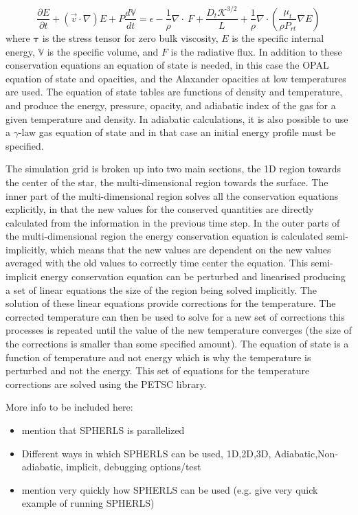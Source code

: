 \documentclass[12pt,a4paper]{book}
\begin{document}
\begin{equation}
\frac{\partial E}{\partial t}+(\vec{v}\cdot\nabla)E+P\frac{d\mathbb{V}}{dt}=\epsilon-\frac{1}{\rho}\nabla\cdot\ F+\frac{D_t\mathcal{K}^{3/2}}{L}+\frac{1}{\rho}\nabla\cdot\left(\frac{\mu_t}{\rho P_{rt}}\nabla E\right)
\end{equation}
where $\mathbf{\tau}$ is the stress tensor for zero bulk viscosity, $E$ is the specific internal energy, $\mathbb{V}$ is the specific volume, and $F$ is the radiative flux. In addition to these conservation equations an equation of state is needed, in this case the OPAL equation of state and opacities, and the Alaxander opacities at low temperatures are used. The equation of state tables are functions of density and temperature, and produce the energy, pressure, opacity, and adiabatic index of the gas for a given temperature and density. In adiabatic calculations, it is also possible to use a $\gamma$-law gas equation of state and in that case an initial energy profile must be specified.

The simulation grid is broken up into two main sections, the 1D region towards the center of the star, the multi-dimensional region towards the surface. The inner part of the multi-dimensional region solves all the conservation equations explicitly, in that the new values for the conserved quantities are directly calculated from the information in the previous time step. In the outer parts of the multi-dimensional region the energy conservation equation is calculated semi-implicitly, which means that the new values are dependent on the new values averaged with the old values to correctly time center the equation. This semi-implicit energy conservation equation can be perturbed and linearised producing a set of linear equations the size of the region being solved implicitly. The solution of these linear equations provide corrections for the temperature. The corrected temperature can then be used to solve for a new set of corrections this processes is repeated until the value of the new temperature converges (the size of the corrections is smaller than some specified amount). The equation of state is a function of temperature and not energy which is why the temperature is perturbed and not the energy. This set of equations for the temperature corrections are solved using the PETSC library.
  
More info to be included here:
\begin{itemize}
\item mention that SPHERLS is parallelized
\item Different ways in which SPHERLS can be used, 1D,2D,3D, Adiabatic,Non-adiabatic, implicit, debugging options/test
\item mention very quickly how SPHERLS can be used (e.g. give very quick example of running SPHERLS)
\end{itemize}
\end{document}
